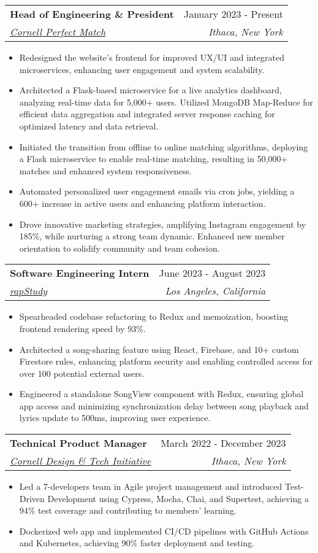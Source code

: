 \documentclass[letterpaper,10pt]{article}
\makeatletter
\newcommand{\resumeItem}[1]{
  \item\small{
    {#1 \vspace{-2pt}}
  }
}
\newcommand{\resumeSubheading}[4]{
  \vspace{-3pt}\item
    \begin{tabular*}{0.96\textwidth}[t]{@{}l@{\extracolsep{\fill}}r@{}}
      \textbf{#1} & #2 \\
      \textit{\small#3} & \textit{\small #4} \\
    \end{tabular*}\vspace{-7pt}
}
\newcommand{\resumeSubSubheading}[2]{
    \item
    \begin{tabular*}{0.97\textwidth}{l@{\extracolsep{\fill}}r}
      \textit{\small#1} & \textit{\small #2} \\
    \end{tabular*}\vspace{-7pt}
}
\newcommand{\resumeItemListStart}{\begin{itemize}}
\newcommand{\resumeItemListEnd}{\end{itemize}\vspace{-5.5pt}}
\makeatother
\begin{document}
\resumeSubheading
{Head of Engineering \& President}{January 2023 - Present}
{\href{https://perfectmatch.ai/}{Cornell Perfect Match}}{Ithaca, New York}
\resumeItemListStart
\resumeItem{Redesigned the website's frontend for improved UX/UI and integrated microservices, enhancing user engagement and system scalability.}
\resumeItem{Architected a Flask-based microservice for a live analytics dashboard, analyzing real-time data for 5,000+ users. Utilized MongoDB Map-Reduce for efficient data aggregation and integrated server response caching for optimized latency and data retrieval.}
\resumeItem{Initiated the transition from offline to online matching algorithms, deploying a Flask microservice to enable real-time matching, resulting in 50,000+ matches and enhanced system responsiveness.}
\resumeItem{Automated personalized user engagement emails via cron jobs, yielding a 600+ increase in active users and enhancing platform interaction.}
\resumeItem{Drove innovative marketing strategies, amplifying Instagram engagement by 185\%, while nurturing a strong team dynamic. Enhanced new member orientation to solidify community and team cohesion.}

\resumeItemListEnd

\resumeSubheading{Software Engineering Intern}{June 2023 - August 2023}{\href{https://rapstudy.com/}{rapStudy}}{Los Angeles, California}
\resumeItemListStart
\resumeItem{Spearheaded codebase refactoring to Redux and memoization, boosting frontend rendering speed by 93\%.}
\resumeItem{Architected a song-sharing feature using React, Firebase, and 10+ custom Firestore rules, enhancing platform security and enabling controlled access for over 100 potential external users.}
\resumeItem{Engineered a standalone SongView component with Redux, ensuring global app access and minimizing synchronization delay between song playback and lyrics update to 500ms, improving user experience.}
\resumeItemListEnd



\resumeSubheading
{Technical Product Manager}{March 2022 - December 2023}
{\href{https://www.cornelldti.org/}{Cornell Design \& Tech Initiative}}{Ithaca, New York}
\resumeItemListStart
\resumeItem{Led a 7-developers team in Agile project management and introduced Test-Driven Development using Cypress, Mocha, Chai, and Supertest, achieving a 94\% test coverage and contributing to members' learning.}
\resumeItem{Dockerized web app and implemented CI/CD pipelines with GitHub Actions and Kubernetes, achieving 90\% faster deployment and testing.}
\resumeItemListEnd
\end{document}
